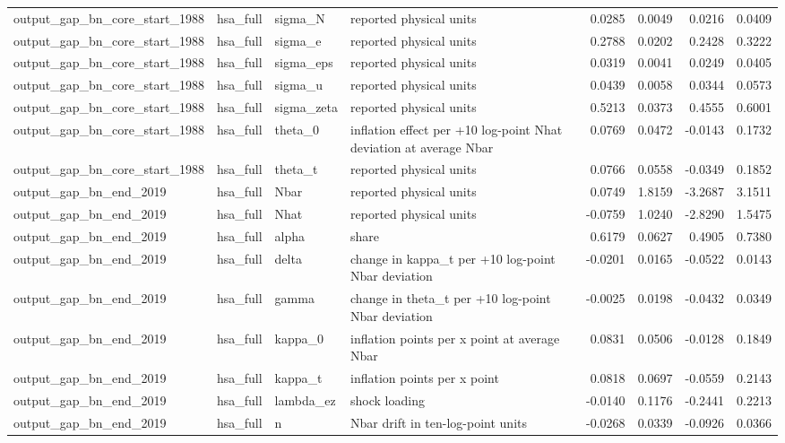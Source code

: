 \begin{tabular}{llllrrrr}
output\_gap\_bn\_core\_start\_1988 & hsa\_full & sigma\_N & reported physical units & 0.0285 & 0.0049 & 0.0216 & 0.0409 \\
output\_gap\_bn\_core\_start\_1988 & hsa\_full & sigma\_e & reported physical units & 0.2788 & 0.0202 & 0.2428 & 0.3222 \\
output\_gap\_bn\_core\_start\_1988 & hsa\_full & sigma\_eps & reported physical units & 0.0319 & 0.0041 & 0.0249 & 0.0405 \\
output\_gap\_bn\_core\_start\_1988 & hsa\_full & sigma\_u & reported physical units & 0.0439 & 0.0058 & 0.0344 & 0.0573 \\
output\_gap\_bn\_core\_start\_1988 & hsa\_full & sigma\_zeta & reported physical units & 0.5213 & 0.0373 & 0.4555 & 0.6001 \\
output\_gap\_bn\_core\_start\_1988 & hsa\_full & theta\_0 & inflation effect per +10 log-point Nhat deviation at average Nbar & 0.0769 & 0.0472 & -0.0143 & 0.1732 \\
output\_gap\_bn\_core\_start\_1988 & hsa\_full & theta\_t & reported physical units & 0.0766 & 0.0558 & -0.0349 & 0.1852 \\
output\_gap\_bn\_end\_2019 & hsa\_full & Nbar & reported physical units & 0.0749 & 1.8159 & -3.2687 & 3.1511 \\
output\_gap\_bn\_end\_2019 & hsa\_full & Nhat & reported physical units & -0.0759 & 1.0240 & -2.8290 & 1.5475 \\
output\_gap\_bn\_end\_2019 & hsa\_full & alpha & share & 0.6179 & 0.0627 & 0.4905 & 0.7380 \\
output\_gap\_bn\_end\_2019 & hsa\_full & delta & change in kappa\_t per +10 log-point Nbar deviation & -0.0201 & 0.0165 & -0.0522 & 0.0143 \\
output\_gap\_bn\_end\_2019 & hsa\_full & gamma & change in theta\_t per +10 log-point Nbar deviation & -0.0025 & 0.0198 & -0.0432 & 0.0349 \\
output\_gap\_bn\_end\_2019 & hsa\_full & kappa\_0 & inflation points per x point at average Nbar & 0.0831 & 0.0506 & -0.0128 & 0.1849 \\
output\_gap\_bn\_end\_2019 & hsa\_full & kappa\_t & inflation points per x point & 0.0818 & 0.0697 & -0.0559 & 0.2143 \\
output\_gap\_bn\_end\_2019 & hsa\_full & lambda\_ez & shock loading & -0.0140 & 0.1176 & -0.2441 & 0.2213 \\
output\_gap\_bn\_end\_2019 & hsa\_full & n & Nbar drift in ten-log-point units & -0.0268 & 0.0339 & -0.0926 & 0.0366 \\

\end{tabular}
